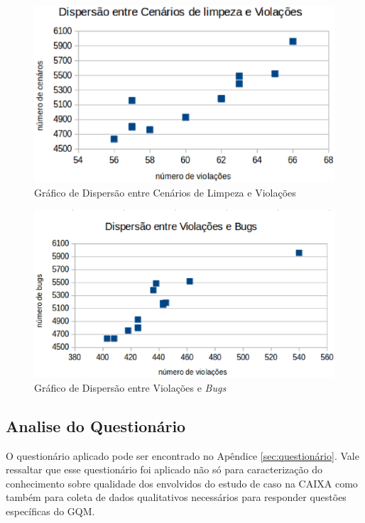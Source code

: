 \begin{figure}[h!]
\centering
\includegraphics[keepaspectratio=false,scale=0.40]{figuras/figuras_nilton/dispersaocenariosviolacoes.eps}
\caption{Gráfico de Dispersão entre Cenários de Limpeza e Violações}
\label{dispersaocenariosviolacoes}
\end{figure}

\begin{figure}[h!]
\centering
\includegraphics[keepaspectratio=false,scale=0.40]{figuras/figuras_nilton/dispersaoviolacoesbugs.eps}
\caption{Gráfico de Dispersão entre Violações e \textit{Bugs}}
\label{dispersaoviolacoesbugs}
\end{figure}

\subsection{Analise do Questionário}

O questionário aplicado pode ser encontrado no Apêndice \ref{sec:questionário}. Vale ressaltar que esse questionário foi aplicado não só para caracterização do conhecimento sobre qualidade dos envolvidos do estudo de caso na CAIXA como também para coleta de dados qualitativos necessários para responder questões específicas do GQM. 

